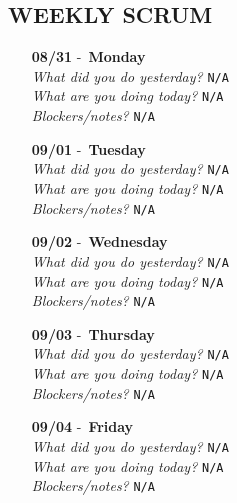 \begin{center}
  \section*{\Huge\textbf{WEEKLY SCRUM}}
\end{center}
\begin{itemize}
  \item[\textbf{08/31}] -\ \textbf{Monday} \\ \textsl{What did you do yesterday?} \texttt{N/A} \\ \textsl{What are you doing today?} \texttt{N/A} \\ \textsl{Blockers/notes?} \texttt{N/A}
  \item[\textbf{09/01}] -\ \textbf{Tuesday} \\ \textsl{What did you do yesterday?} \texttt{N/A} \\ \textsl{What are you doing today?} \texttt{N/A} \\ \textsl{Blockers/notes?} \texttt{N/A}
  \item[\textbf{09/02}] -\ \textbf{Wednesday} \\ \textsl{What did you do yesterday?} \texttt{N/A} \\ \textsl{What are you doing today?} \texttt{N/A} \\ \textsl{Blockers/notes?} \texttt{N/A}
  \item[\textbf{09/03}] -\ \textbf{Thursday} \\ \textsl{What did you do yesterday?} \texttt{N/A} \\ \textsl{What are you doing today?} \texttt{N/A} \\ \textsl{Blockers/notes?} \texttt{N/A}
  \item[\textbf{09/04}] -\ \textbf{Friday} \\ \textsl{What did you do yesterday?} \texttt{N/A} \\ \textsl{What are you doing today?} \texttt{N/A} \\ \textsl{Blockers/notes?} \texttt{N/A}
\end{itemize}